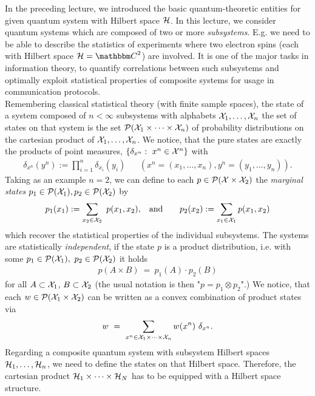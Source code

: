 In the preceding lecture, we introduced the basic quantum-theoretic entities for given quantum system with Hilbert space ${\mathcal H}$. In this lecture, we consider quantum systems
which are composed of two or more \emph{subsystems}. E.g. we need to be able to describe the statistics of experiments where two electron spins (each with Hilbert space $\cH = \bbmC^2$) are involved. 
It is one of the major tasks in information theory, to quantify correlations between such subsystems and optimally exploit statistical properties of composite systems for usage in communication protocols. \\
Remembering classical statistical theory (with finite sample spaces), the state of a system composed of $n < \infty$ subsystems with alphabets ${\mathcal X}_1,\dots,{\mathcal X}_n$ the set of states on that system 
is the set ${\mathcal P}({\mathcal X}_1 \times \cdots \times {\mathcal X}_n)$ of probability distributions on the cartesian product of ${\mathcal X}_1,\dots,{\mathcal X}_n$. We notice, that the pure states are exactly the products of point measures, $\{\delta_{x^n}: \ x^n \in {\mathcal X}^n \}$ with 
\begin{align*}
 \delta_{x^n}(y^n) := \prod_{i=1}^n \delta_{x_i}(y_i) && (x^n = (x_1,\dots,x_n), y^n = (y_1,\dots,y_n)).
\end{align*} 
Taking as an example $n=2$, we can define to each $p \in {\mathcal P}({\mathcal X} \times {\mathcal X}_2)$ the \emph{marginal states} $p_1 \in {\mathcal P}({\mathcal X}_1), p_2 \in {\mathcal P}({\mathcal X}_2)$ by
\begin{align*}
p_1(x_1) := \sum_{x_2 \in {\mathcal X}_2} \ p(x_1,x_2), \hspace{.3cm} \text{and} \hspace{.7cm} p_2(x_2) := \sum_{x_1 \in {\mathcal X}_1} p(x_1,x_2)  
\end{align*}
which recover the statistical properties of the individual subsystems. The systems are statistically \emph{independent}, if the state $p$ is a product distribution, i.e. with some $p_1 \in {\mathcal P}({\mathcal X}_1), \ p_2 \in {\mathcal P}({\mathcal X}_2)$ it holds
\begin{align*}
   p(A \times B) \ = \ p_1(A)\cdot p_2(B)
\end{align*}
for all $A \subset {\mathcal X}_1$, $B \subset {\mathcal X}_2$ (the usual notation is then "$p = p_1 \otimes p_2$".) We notice, that each $w \in {\mathcal P}({\mathcal X}_1 \times {\mathcal X}_2)$ can be written as a convex combination of product states via
\begin{align*}
 w \ = \ \sum_{x^n \in \cX_1 \times \cdots \times \cX_n} w(x^n)  \ \delta_{x^n}.
\end{align*}
Regarding a composite quantum system with subsystem Hilbert spaces ${\mathcal H}_1,\dots, {\mathcal H}_n$, we need to define the states on that Hilbert space. Therefore, the cartesian product ${\mathcal H}_1 \times \dots \times {\mathcal H}_N$ has to be equipped with a Hilbert space structure. 
